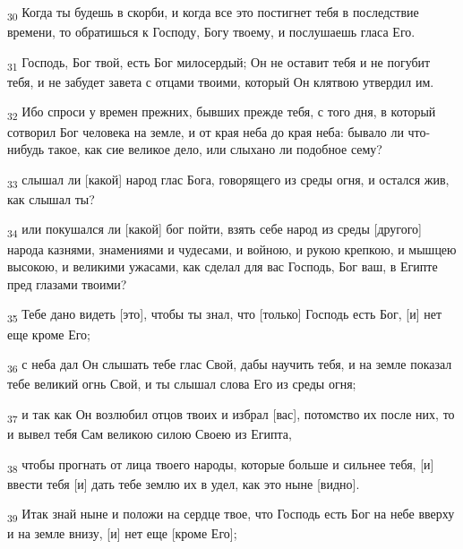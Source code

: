 \begin{tcolorbox}
\textsubscript{30} Когда ты будешь в скорби, и когда все это постигнет тебя в последствие времени, то обратишься к Господу, Богу твоему, и послушаешь гласа Его.
\end{tcolorbox}
\begin{tcolorbox}
\textsubscript{31} Господь, Бог твой, есть Бог милосердый; Он не оставит тебя и не погубит тебя, и не забудет завета с отцами твоими, который Он клятвою утвердил им.
\end{tcolorbox}
\begin{tcolorbox}
\textsubscript{32} Ибо спроси у времен прежних, бывших прежде тебя, с того дня, в который сотворил Бог человека на земле, и от края неба до края неба: бывало ли что-нибудь такое, как сие великое дело, или слыхано ли подобное сему?
\end{tcolorbox}
\begin{tcolorbox}
\textsubscript{33} слышал ли [какой] народ глас Бога, говорящего из среды огня, и остался жив, как слышал ты?
\end{tcolorbox}
\begin{tcolorbox}
\textsubscript{34} или покушался ли [какой] бог пойти, взять себе народ из среды [другого] народа казнями, знамениями и чудесами, и войною, и рукою крепкою, и мышцею высокою, и великими ужасами, как сделал для вас Господь, Бог ваш, в Египте пред глазами твоими?
\end{tcolorbox}
\begin{tcolorbox}
\textsubscript{35} Тебе дано видеть [это], чтобы ты знал, что [только] Господь есть Бог, [и] нет еще кроме Его;
\end{tcolorbox}
\begin{tcolorbox}
\textsubscript{36} с неба дал Он слышать тебе глас Свой, дабы научить тебя, и на земле показал тебе великий огнь Свой, и ты слышал слова Его из среды огня;
\end{tcolorbox}
\begin{tcolorbox}
\textsubscript{37} и так как Он возлюбил отцов твоих и избрал [вас], потомство их после них, то и вывел тебя Сам великою силою Своею из Египта,
\end{tcolorbox}
\begin{tcolorbox}
\textsubscript{38} чтобы прогнать от лица твоего народы, которые больше и сильнее тебя, [и] ввести тебя [и] дать тебе землю их в удел, как это ныне [видно].
\end{tcolorbox}
\begin{tcolorbox}
\textsubscript{39} Итак знай ныне и положи на сердце твое, что Господь есть Бог на небе вверху и на земле внизу, [и] нет еще [кроме Его];
\end{tcolorbox}
